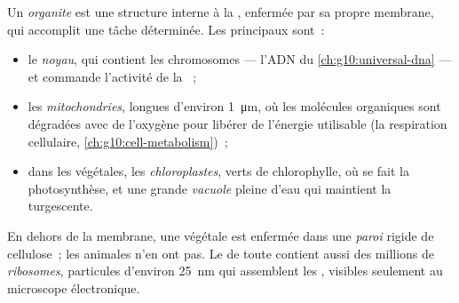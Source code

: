 \begin{definition}[Organite]\label{def:g10:cells-common-unit:organelle}
Un \emph{organite} est une structure interne à la
, enfermée par sa propre membrane, qui accomplit une tâche
déterminée. Les principaux sont~:
\begin{itemize}
  \item le \emph{noyau}, qui contient les chromosomes ---
        l'ADN du \cref{ch:g10:universal-dna} --- et commande l'activité
        de la ~;
  \item les \emph{mitochondries}, longues d'environ
        \qty{1}{\micro m}, où les molécules organiques sont dégradées
        avec de l'oxygène pour libérer de l'énergie utilisable (la
        respiration cellulaire, \cref{ch:g10:cell-metabolism})~;
  \item dans les  végétales, les
        \emph{chloroplastes}, verts de
        chlorophylle, où se fait la photosynthèse, et une grande
        \emph{vacuole} pleine d'eau qui maintient la
         turgescente.
\end{itemize}
En dehors de la membrane, une  végétale est enfermée dans une
\emph{paroi} rigide de cellulose~; les  animales
n'en ont pas. Le  de toute  contient aussi des
millions de \emph{ribosomes}, particules d'environ
\qty{25}{nm} qui assemblent les , visibles seulement au
microscope électronique.
\end{definition}

